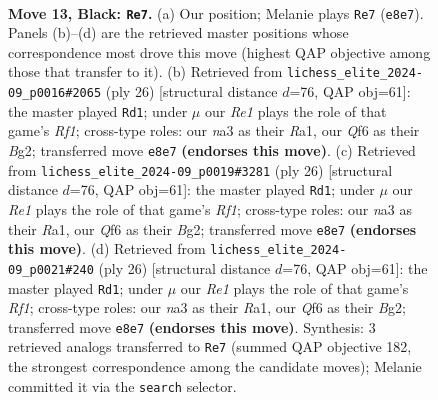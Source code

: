 \documentclass[11pt]{article}
\begin{document}
\begin{figure}[p]
\label{fig:thought-m23}
\end{figure}

\clearpage

\begin{figure}[p]\centering
\begin{subfigure}{0.46\textwidth}\centering
\resizebox{\linewidth}{!}{%
\newchessgame
\chessboard[
  setfen={rn2r1k1/pp3ppp/3bbq2/3p4/3N4/N2B4/PPP2PPP/R2Q1RK1 b - - 0 13},
  showmover=false,
  pgfstyle=straightmove, color=movearrow, markmove={e8-e7}
]}
\caption{}
\end{subfigure}\hfill
\begin{subfigure}{0.46\textwidth}\centering
\resizebox{\linewidth}{!}{%
\newchessgame
\chessboard[
  setfen={r4rk1/ppqb1ppp/3bpn2/8/2PQ4/2N3P1/PP3PBP/R1B2RK1 w - - 3 14},
  showmover=false,
  pgfstyle=straightmove, color=movearrow, markmove={f1-d1}
]}
\caption{}
\end{subfigure}
\\[4pt]
\begin{subfigure}{0.46\textwidth}\centering
\resizebox{\linewidth}{!}{%
\newchessgame
\chessboard[
  setfen={r4rk1/ppqb1ppp/3bpn2/8/2PQ4/2N3P1/PP3PBP/R1B2RK1 w - - 3 14},
  showmover=false,
  pgfstyle=straightmove, color=movearrow, markmove={f1-d1}
]}
\caption{}
\end{subfigure}\hfill
\begin{subfigure}{0.46\textwidth}\centering
\resizebox{\linewidth}{!}{%
\newchessgame
\chessboard[
  setfen={r4rk1/ppqb1ppp/3bpn2/8/2PQ4/2N3P1/PP3PBP/R1B2RK1 w - - 3 14},
  showmover=false,
  pgfstyle=straightmove, color=movearrow, markmove={f1-d1}
]}
\caption{}
\end{subfigure}
\caption{\textbf{Move 13, Black: \texttt{Re7}.} (a) Our position; Melanie plays \texttt{Re7} (\texttt{e8e7}). Panels (b)--(d) are the retrieved master positions whose correspondence most drove this move (highest QAP objective among those that transfer to it). (b) Retrieved from \texttt{lichess\_elite\_2024-09\_p0016\#2065} (ply 26) [structural distance $d$=76, QAP obj=61]: the master played \texttt{Rd1}; under $\mu$ our \emph{Re1} plays the role of that game's \emph{Rf1}; cross-type roles: our \emph{n}a3 as their \emph{R}a1, our \emph{Q}f6 as their \emph{B}g2; transferred move \texttt{e8e7} \textbf{(endorses this move)}. (c) Retrieved from \texttt{lichess\_elite\_2024-09\_p0019\#3281} (ply 26) [structural distance $d$=76, QAP obj=61]: the master played \texttt{Rd1}; under $\mu$ our \emph{Re1} plays the role of that game's \emph{Rf1}; cross-type roles: our \emph{n}a3 as their \emph{R}a1, our \emph{Q}f6 as their \emph{B}g2; transferred move \texttt{e8e7} \textbf{(endorses this move)}. (d) Retrieved from \texttt{lichess\_elite\_2024-09\_p0021\#240} (ply 26) [structural distance $d$=76, QAP obj=61]: the master played \texttt{Rd1}; under $\mu$ our \emph{Re1} plays the role of that game's \emph{Rf1}; cross-type roles: our \emph{n}a3 as their \emph{R}a1, our \emph{Q}f6 as their \emph{B}g2; transferred move \texttt{e8e7} \textbf{(endorses this move)}. Synthesis: 3 retrieved analogs transferred to \texttt{Re7} (summed QAP objective 182, the strongest correspondence among the candidate moves); Melanie committed it via the \texttt{search} selector.}

\end{figure}
\end{document}
